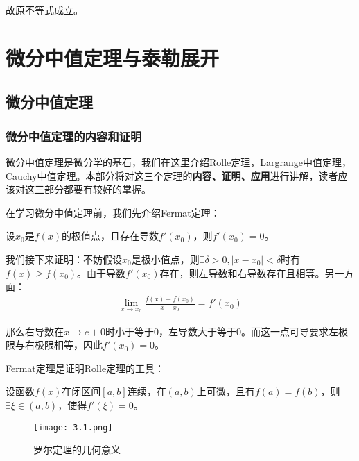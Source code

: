 \documentclass{ctexart}
\let\oldtextbf\textbf %
\renewcommand{\textbf}[1]{\textcolor{btex}{\oldtextbf{#1}}} %
\begin{document}
故原不等式成立。

\section{微分中值定理与泰勒展开}
\subsection{微分中值定理}
\subsubsection{微分中值定理的内容和证明}
微分中值定理是微分学的基石，我们在这里介绍Rolle定理，Largrange中值定理，Cauchy中值定理。本部分将对这三个定理的\textbf{内容、证明、应用}进行讲解，读者应该对这三部分都要有较好的掌握。

在学习微分中值定理前，我们先介绍Fermat定理：
\begin{tcolorbox}[
    colback=bac1,     %
    colframe=fra1,   %
    coltitle=white,             %
    coltext=tex1,
    title=Fermat定理,
    fonttitle=\bfseries,        %
arc=3mm,                     %
breakable
]
设$x_0$是$f(x)$的极值点，且存在导数$f'(x_0)$，则$f'(x_0)=0$。
\end{tcolorbox}

我们接下来证明：不妨假设$x_0$是极小值点，则$\exists \delta>0,|x-x_0|<\delta$时有$f(x)\geq f(x_0)$。由于导数$f'(x_0)$存在，则左导数和右导数存在且相等。另一方面：
\begin{align*}
    \lim_{x\to x_0}\frac{f(x)-f(x_0)}{x-x_0}=f'(x_0)
\end{align*}

那么右导数在$x\to c+0$时小于等于0，左导数大于等于0。而这一点可导要求左极限与右极限相等，因此$f'(x_0)=0$。

Fermat定理是证明Rolle定理的工具：
\begin{tcolorbox}[
    colback=bac1,     %
    colframe=fra1,   %
    coltitle=white,             %
    coltext=tex1,
    title=Rolle罗尔定理,
    fonttitle=\bfseries,        %
arc=3mm,                     %
breakable
]
设函数$f(x)$在闭区间$[a,b]$连续，在$(a,b)$上可微，且有$f(a)=f(b)$，则$\exists \xi \in (a,b)$，使得$f'(\xi)=0$。
\end{tcolorbox}
\begin{figure}[H]    
\centering     
\renewcommand{\figurename}{图}     
\renewcommand{\thefigure}{3.1}    
\begin{myimagebox}[width=0.44\textwidth] %
\texttt{[image: 3.1.png]} %
\end{myimagebox}     
\caption{\label{fig:3.1}罗尔定理的几何意义}   
\end{figure}
\end{document}
